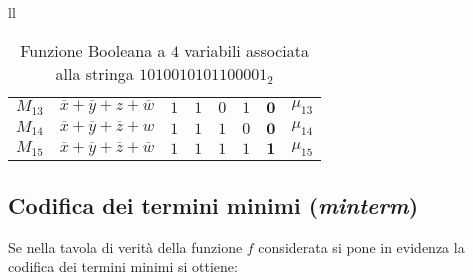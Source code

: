 \documentclass[a4paper]{extarticle}
\begin{document}
\begin{table}[H]
\begin{tabularx}{\textwidth}{ll}
{\begin{tabular}{c|c||cccc||c|c}
          $M_{13}$ & $\overline{x} + \overline{y} + z + \overline{w}$ & $1$ & $1$ & $0$ & $1$ & $\boldsymbol{0}$ & $\mu_{13}$\\
          $M_{14}$ & $\overline{x} + \overline{y} + \overline{z} + w$ & $1$ & $1$ & $1$ & $0$ & $\boldsymbol{0}$ & $\mu_{14}$\\
          $M_{15}$ & $\overline{x} + \overline{y} + \overline{z} + \overline{w}$ & $1$ & $1$ & $1$ & $1$ & $\boldsymbol{1}$ & $\mu_{15}$\\
        \end{tabular}
    }
  \end{tabularx}
  \caption{Funzione Booleana a $4$ variabili associata alla stringa $1010010101100001_2$}
  \label{tab:funzione_booleana_associata_stringa}
\end{table}

\subsection{Codifica dei termini minimi (\emph{minterm})}
Se nella tavola di verità della funzione $f$ considerata si pone in evidenza la codifica dei termini minimi si ottiene:
\end{document}
